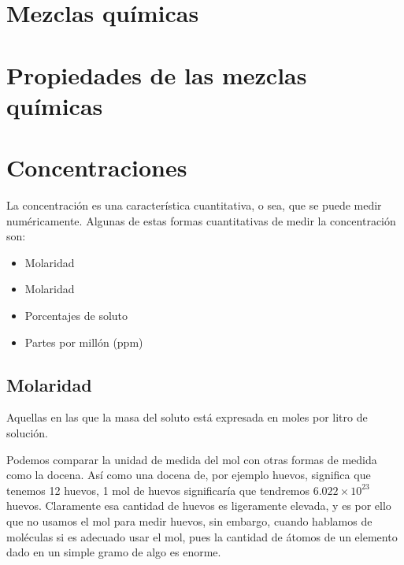 \section{Mezclas químicas}



\section{Propiedades de las mezclas químicas}



\section{Concentraciones}



La concentración es una característica cuantitativa, o sea, que se puede medir numéricamente. Algunas de estas formas cuantitativas de medir la concentración son:

\begin{itemize}
    \item Molaridad
    \item Molaridad
    \item Porcentajes de soluto
    \item Partes por millón (ppm)
\end{itemize}

\subsection{Molaridad}

Aquellas en las que la masa del soluto está expresada en moles por litro de solución.


Podemos comparar la unidad de medida del mol con otras formas de medida como la docena. Así como una docena de, por ejemplo huevos, significa que tenemos 12 huevos, 1 mol de huevos significaría que tendremos $6.022 \times 10^{23}$ huevos. Claramente esa cantidad de huevos es ligeramente elevada, y es por ello que no usamos el mol para medir huevos, sin embargo, cuando hablamos de moléculas si es adecuado usar el mol, pues la cantidad de átomos de un elemento dado en un simple gramo de algo es enorme.

